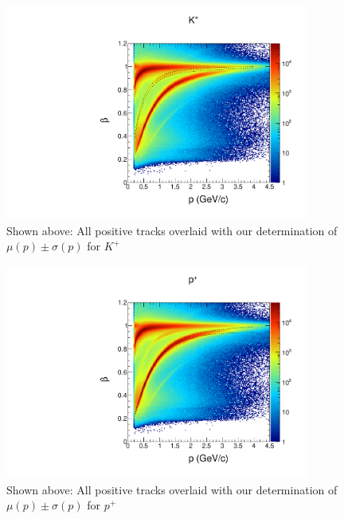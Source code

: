 \begin{figure}
  \begin{center}
    \includegraphics[width=10cm]{image/beautiful_pbeta_kp.pdf}
    \caption{ Shown above: All positive tracks overlaid with our determination of $\mu(p) \pm \sigma(p)$ for $K^+$}
  \end{center}
\end{figure}

\begin{figure}
  \begin{center}
    \includegraphics[width=10cm]{image/beautiful_pbeta_prot.pdf}
    \caption{ Shown above: All positive tracks overlaid with our determination of $\mu(p) \pm \sigma(p)$ for $p^+$}
  \end{center}
\end{figure}




